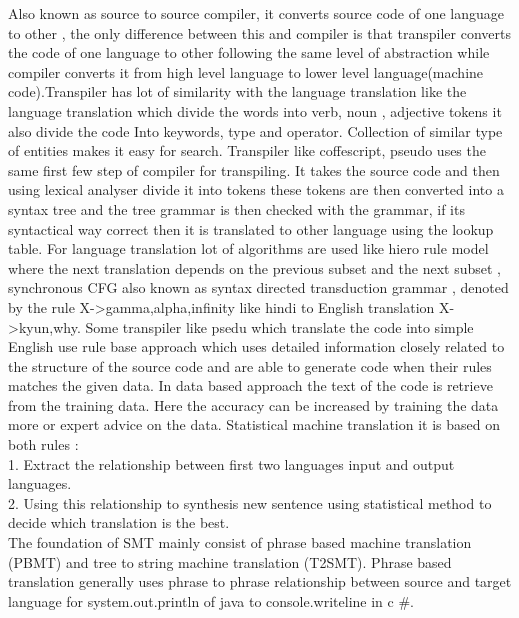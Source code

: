 \documentclass[23pt]{article}
\begin{document}
{\Large Also known as source to source compiler, it converts source code of one language to other  , the only difference between this and compiler is that transpiler converts the code of one language to other following the same level of abstraction while compiler converts it from high level language to lower level language(machine code).Transpiler has lot of similarity with the language translation like the language translation which divide the words into verb, noun , adjective tokens it also divide the code 
Into keywords, type and operator. Collection of similar type of entities makes it easy for search.
Transpiler like coffescript, pseudo uses the same first few step of compiler for transpiling. It takes the source code and then using lexical analyser divide it into tokens these tokens are then converted into a syntax tree and the tree grammar is then checked with the grammar, if its syntactical way correct then it is translated to other language using the lookup table. For language translation lot of algorithms are used  like hiero rule model where the next translation depends on the previous subset and the next subset , synchronous  CFG  also known as syntax directed transduction grammar , denoted by the rule    X->{gamma,alpha,infinity} like hindi to English translation X->{kyun,why}. Some transpiler like psedu which translate the code into simple English use rule base approach which uses detailed information closely related to the structure of the source code and are able to generate code when their rules matches the given data. In data based approach the text of the code is retrieve from the training data. Here the accuracy can be increased by training the data more or expert advice on the data. Statistical machine translation it is based on both rules : \\ 1.	 Extract the relationship between first two languages input and output languages. \\
2. Using this relationship to synthesis new sentence using statistical method to decide which translation is the best. \\
The foundation of SMT mainly consist of phrase based machine translation (PBMT) and tree to string machine translation (T2SMT). Phrase based translation generally uses phrase to phrase relationship between source and target language for system.out.println of java to console.writeline in c \#.
}
\end{document}

